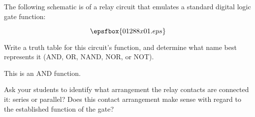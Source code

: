 

The following schematic is of a relay circuit that emulates a standard digital logic gate function:

$$\epsfbox{01288x01.eps}$$

Write a truth table for this circuit's function, and determine what name best represents it (AND, OR, NAND, NOR, or NOT).







This is an AND function.







Ask your students to identify what arrangement the relay contacts are connected it: series or parallel?  Does this contact arrangement make sense with regard to the established function of the gate?




